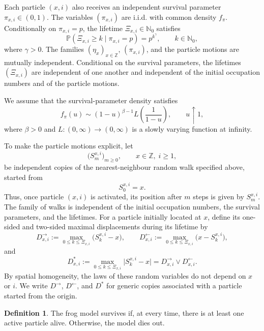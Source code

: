 \documentclass[reqno,final,11pt]{amsart}
\newcommand{\Z}{\mathbb Z}
\newcommand{\Nzero}{\mathbb N_0}
\newcommand{\Pbb}{\mathbb P}
\theoremstyle{plain}
\theoremstyle{definition}
\newtheorem{definition}[theorem]{Definition}
\theoremstyle{remark}
\numberwithin{equation}{section}
\begin{document}
Each particle \((x,i)\) also receives an independent survival parameter
\(\pi_{x,i}\in(0,1)\). The variables \((\pi_{x,i})\) are i.i.d. with
common density \(f_\pi\). Conditionally on \(\pi_{x,i}=p\), the lifetime
\(\Xi_{x,i}\in\Nzero\) satisfies
\begin{equation}\label{eq:weibull-life}
  \Pbb(\Xi_{x,i}\ge k\mid \pi_{x,i}=p)
  =
  p^{k^\gamma},
  \qquad k\in\Nzero,
\end{equation}
where \(\gamma>0\). The families \((\eta_x)_{x\in\Z}\),
\((\pi_{x,i})\), and the particle motions are mutually independent.
Conditional on the survival parameters, the lifetimes \((\Xi_{x,i})\) are
independent of one another and independent of the initial occupation numbers
and of the particle motions.

We assume that the survival-parameter density satisfies
\begin{equation}\label{eq:right-edge}
  f_\pi(u)
  \sim
  (1-u)^{\beta-1}
  L\left(\frac1{1-u}\right),
  \qquad u\uparrow1,
\end{equation}
where \(\beta>0\) and \(L:(0,\infty)\to(0,\infty)\) is a slowly varying function at infinity.



To make the particle motions explicit, let
\[
  \bigl(S_m^{x,i}\bigr)_{m\ge0},
  \qquad x\in\Z,\; i\ge1,
\]
be independent copies of the nearest-neighbour random walk specified above,
started from
\[
  S_0^{x,i}=x.
\]
Thus, once particle \((x,i)\) is activated, its position after \(m\) steps is
given by \(S_m^{x,i}\). The family of walks is independent of the initial
occupation numbers, the survival parameters, and the lifetimes.
For a particle initially located at \(x\), define its one-sided and two-sided
maximal displacements during its lifetime by
\[
  D_{x,i}^{\to}
  :=
  \max_{0\le k\le \Xi_{x,i}}
  \bigl(S_k^{x,i}-x\bigr),
  \qquad
  D_{x,i}^{\leftarrow}
  :=
  \max_{0\le k\le \Xi_{x,i}}
  \bigl(x-S_k^{x,i}\bigr),
\]
and
\[
  D_{x,i}^*
  :=
  \max_{0\le k\le \Xi_{x,i}}
  \bigl|S_k^{x,i}-x\bigr|
  =
  D_{x,i}^{\to}\vee D_{x,i}^{\leftarrow}.
\]
By spatial homogeneity, the laws of these random variables do not depend on
\(x\) or \(i\). We write \(D^\to\), \(D^\leftarrow\), and \(D^*\) for
generic copies associated with a particle started from the origin.
\begin{definition}
The frog model survives if, at every time, there is at least one active particle
alive. Otherwise, the model dies out.
\end{definition}
\end{document}
